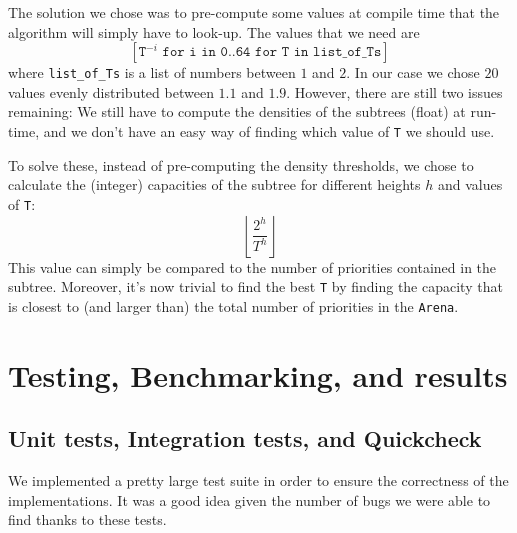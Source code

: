 \documentclass[12pt]{article}
\begin{document}
The solution we chose was to pre-compute some values at compile time that the algorithm will simply have to look-up.
The values that we need are
$$[\texttt{T}^{-i} \texttt{  for i in 0..64  for T in list\_of\_Ts}]$$
where \texttt{list\_of\_Ts} is a list of numbers between $1$ and $2$. In our case we chose $20$ values evenly distributed between $1.1$ and $1.9$.
However, there are still two issues remaining: We still have to compute the densities of the subtrees (float) at run-time, and we don't have an easy way of finding which value of \texttt{T} we should use.

To solve these, instead of pre-computing the density thresholds, we chose to calculate the (integer) capacities of the subtree for different heights $h$ and values of \texttt{T}:
$$ \left\lfloor \frac{2^h}{T^h} \right\rfloor $$
This value can simply be compared to the number of priorities contained in the subtree.
Moreover, it's now trivial to find the best \texttt{T} by finding the capacity that is closest to (and larger than) the total number of priorities in the \texttt{Arena}.


\newpage
\section{Testing, Benchmarking, and results}

\subsection{Unit tests, Integration tests, and Quickcheck}

We implemented a pretty large test suite in order to ensure the correctness of the implementations. It was a good idea given the number of bugs we were able to find thanks to these tests.
\end{document}
